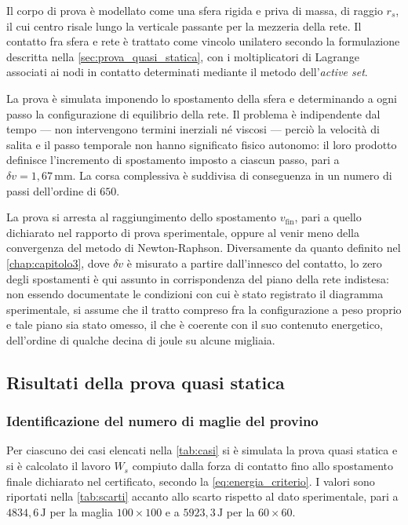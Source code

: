 Il corpo di prova è modellato come una sfera rigida e priva di massa, di raggio $r_s$, il cui centro risale lungo la verticale passante per la mezzeria della rete. Il contatto fra sfera e rete è trattato come vincolo unilatero secondo la formulazione descritta nella \cref{sec:prova_quasi_statica}, con i moltiplicatori di Lagrange associati ai nodi in contatto determinati mediante il metodo dell'\textit{active set}.

La prova è simulata imponendo lo spostamento della sfera e determinando a ogni passo la configurazione di equilibrio della rete. Il problema è indipendente dal tempo — non intervengono termini inerziali né viscosi — perciò la velocità di salita e il passo temporale non hanno significato fisico autonomo: il loro prodotto definisce l'incremento di spostamento imposto a ciascun passo, pari a $\delta v = 1,67\,\text{mm}$. La corsa complessiva è suddivisa di conseguenza in un numero di passi dell'ordine di $650$.

La prova si arresta al raggiungimento dello spostamento $v_{\text{fin}}$, pari a quello dichiarato nel rapporto di prova sperimentale, oppure al venir meno della convergenza del metodo di Newton-Raphson. Diversamente da quanto definito nel \cref{chap:capitolo3}, dove $\delta v$ è misurato a partire dall'innesco del contatto, lo zero degli spostamenti è qui assunto in corrispondenza del piano della rete indistesa: non essendo documentate le condizioni con cui è stato registrato il diagramma sperimentale, si assume che il tratto compreso fra la configurazione a peso proprio e tale piano sia stato omesso, il che è coerente con il suo contenuto energetico, dell'ordine di qualche decina di joule su alcune migliaia.


\subsection{Risultati della prova quasi statica}
\label{sec:risultati}

\subsubsection{Identificazione del numero di maglie del provino}
Per ciascuno dei casi elencati nella \cref{tab:casi} si è simulata la prova quasi statica e si è calcolato il lavoro $W_s$ compiuto dalla forza di contatto fino allo spostamento finale dichiarato nel certificato, secondo la \eqref{eq:energia_criterio}. I valori sono riportati nella \cref{tab:scarti} accanto allo scarto rispetto al dato sperimentale, pari a $4834,6\,\text{J}$ per la maglia $100\times100$ e a $5923,3\,\text{J}$ per la $60\times60$.

